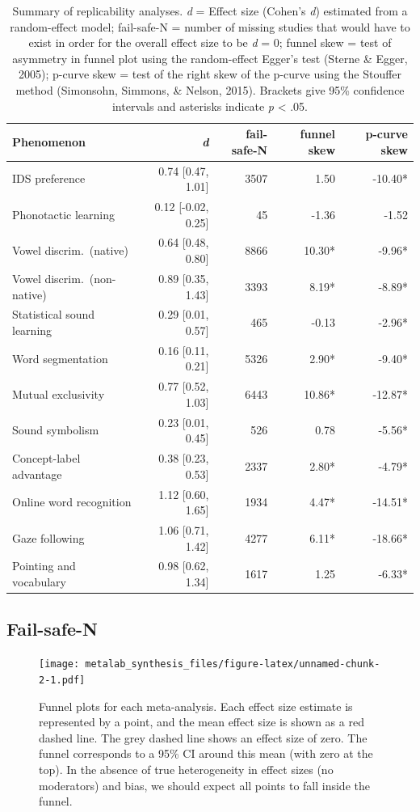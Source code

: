 \documentclass[english,floatsintext,man]{apa6}
\theoremstyle{definition}
\theoremstyle{definition}
\theoremstyle{remark}
\begin{document}
\begin{table}[t]
\footnotesize
\begin{tabular}{lrrrr}
\toprule
\textbf{Phenomenon} & \textbf{\textit{d}} & \textbf{fail-safe-N} & \textbf{funnel skew} & \textbf{p-curve skew}\\
\midrule
IDS preference & 0.74 [0.47, 1.01] & 3507 & 1.50 & -10.40*\\
Phonotactic learning & 0.12 [-0.02, 0.25] & 45 & -1.36 & -1.52\\
Vowel discrim.\ (native) & 0.64 [0.48, 0.80] & 8866 & 10.30* & -9.96*\\
Vowel discrim.\ (non-native) & 0.89 [0.35, 1.43] & 3393 & 8.19* & -8.89*\\
Statistical sound learning & 0.29 [0.01, 0.57] & 465 & -0.13 & -2.96*\\
Word segmentation & 0.16 [0.11, 0.21] & 5326 & 2.90* & -9.40*\\
Mutual exclusivity & 0.77 [0.52, 1.03] & 6443 & 10.86* & -12.87*\\
Sound symbolism & 0.23 [0.01, 0.45] & 526 & 0.78 & -5.56*\\
Concept-label advantage & 0.38 [0.23, 0.53] & 2337 & 2.80* & -4.79*\\
Online word recognition & 1.12 [0.60, 1.65] & 1934 & 4.47* & -14.51*\\
Gaze following & 1.06 [0.71, 1.42] & 4277 & 6.11* & -18.66*\\
Pointing and vocabulary & 0.98 [0.62, 1.34] & 1617 & 1.25 & -6.33*\\
\bottomrule
\end{tabular}
\caption{Summary of replicability analyses. \textit{d} = Effect size (Cohen's {\it d}) estimated from a random-effect model; fail-safe-N = number of missing studies that would have to exist in order for the overall effect size to be {\it d} = 0; funnel skew = test of asymmetry in funnel plot using the random-effect Egger's test (Sterne \& Egger, 2005); p-curve skew = test of the right skew of the p-curve using the Stouffer method (Simonsohn, Simmons, \& Nelson, 2015). Brackets give 95\% confidence intervals and asterisks indicate {\it p} < .05.}
\end{table}

\subsection{Fail-safe-N}\label{fail-safe-n}

\begin{figure}
\centering
\texttt{[image: metalab\_synthesis\_files/figure-latex/unnamed-chunk-2-1.pdf]}
\caption{\label{fig:unnamed-chunk-2}Funnel plots for each meta-analysis.
Each effect size estimate is represented by a point, and the mean effect
size is shown as a red dashed line. The grey dashed line shows an effect
size of zero. The funnel corresponds to a 95\% CI around this mean (with
zero at the top). In the absence of true heterogeneity in effect sizes
(no moderators) and bias, we should expect all points to fall inside the
funnel.}
\end{figure}
\end{document}

